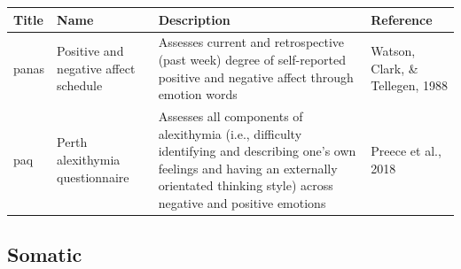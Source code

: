 \documentclass[]{book}
\begin{document}
\begin{longtable}[]{@{}llll@{}}
\toprule
\begin{minipage}[b]{0.22\columnwidth}\raggedright
Title\strut
\end{minipage} & \begin{minipage}[b]{0.27\columnwidth}\raggedright
Name\strut
\end{minipage} & \begin{minipage}[b]{0.22\columnwidth}\raggedright
Description\strut
\end{minipage} & \begin{minipage}[b]{0.18\columnwidth}\raggedright
Reference\strut
\end{minipage}\tabularnewline
\midrule
\endhead
\begin{minipage}[t]{0.22\columnwidth}\raggedright
panas\strut
\end{minipage} & \begin{minipage}[t]{0.27\columnwidth}\raggedright
Positive and negative affect schedule\strut
\end{minipage} & \begin{minipage}[t]{0.22\columnwidth}\raggedright
Assesses current and retrospective (past week) degree of self-reported positive and negative affect through emotion words\strut
\end{minipage} & \begin{minipage}[t]{0.18\columnwidth}\raggedright
Watson, Clark, \& Tellegen, 1988\strut
\end{minipage}\tabularnewline
\begin{minipage}[t]{0.22\columnwidth}\raggedright
paq\strut
\end{minipage} & \begin{minipage}[t]{0.27\columnwidth}\raggedright
Perth alexithymia questionnaire\strut
\end{minipage} & \begin{minipage}[t]{0.22\columnwidth}\raggedright
Assesses all components of alexithymia (i.e., difficulty identifying and describing one's own feelings and having an externally orientated thinking style) across negative and positive emotions\strut
\end{minipage} & \begin{minipage}[t]{0.18\columnwidth}\raggedright
Preece et al., 2018\strut
\end{minipage}\tabularnewline
\bottomrule
\end{longtable}

\hypertarget{somatic}{%
\subsection{Somatic}\label{somatic}}
\end{document}
